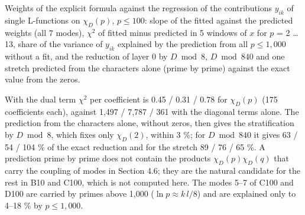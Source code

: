\documentclass[
  10pt,
]{article}
\begin{document}
Weights of the explicit formula against the regression of the
contributions \(y_{ik}\) of single L-functions on \(\chi_D(p)\),
\(p \le 100\): slope of the fitted against the predicted weights (all 7
modes), \(\chi^2\) of fitted minus predicted in 5 windows of \(x\) for
\(p\) = 2 \ldots{} 13, share of the variance of \(y_{ik}\) explained by
the prediction from all \(p \le 1{,}000\) without a fit, and the
reduction of layer 0 by \(D \bmod 8\), \(D \bmod 840\) and one stretch
predicted from the characters alone (prime by prime) against the exact
value from the zeros.

With the dual term \(\chi^2\) per coefficient is 0.45 / 0.31 / 0.78 for
\(\chi_D(p)\) (175 coefficients each), against 1,497 / 7,787 / 361 with
the diagonal terms alone. The prediction from the characters alone,
without zeros, then gives the stratification by \(D \bmod 8\), which
fixes only \(\chi_D(2)\), within 3 \%; for \(D \bmod 840\) it gives 63 /
54 / 104 \% of the exact reduction and for the stretch 89 / 76 / 65 \%.
A prediction prime by prime does not contain the products
\(\chi_D(p)\chi_D(q)\) that carry the coupling of modes in Section 4.6;
they are the natural candidate for the rest in B10 and C100, which is
not computed here. The modes 5--7 of C100 and D100 are carried by primes
above 1,000 (\(\ln p \approx k\,l/8\)) and are explained only to 4--18
\% by \(p \le 1{,}000\).
\end{document}
